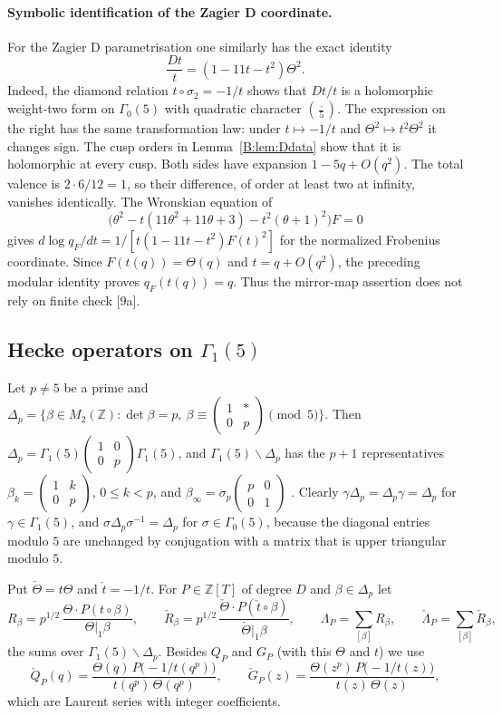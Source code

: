 \documentclass[11pt,a4paper]{article}
\theoremstyle{definition}\newtheorem{definition}[theorem]{Definition}
\theoremstyle{remark}\newtheorem{remark}[theorem]{Remark}
\newcommand{\Z}{\mathbb Z}
\newcommand{\bmat}[4]{\left(\begin{smallmatrix}#1&#2\\#3&#4\end{smallmatrix}\right)}
\numberwithin{equation}{section}
\begin{document}
\paragraph{Symbolic identification of the Zagier D coordinate.}
For the Zagier D parametrisation one similarly has the exact identity
\[
 \frac{Dt}{t}=(1-11t-t^2)\Theta^2.
\]
Indeed, the diamond relation $t\circ\sigma_2=-1/t$ shows that $Dt/t$
is a holomorphic weight-two form on $\Gamma_0(5)$ with quadratic
character $(\frac{\cdot}{5})$. The expression on the right has the
same transformation law: under $t\mapsto-1/t$ and
$\Theta^2\mapsto t^2\Theta^2$ it changes sign. The cusp orders in
Lemma~\ref{B:lem:Ddata} show that it is holomorphic at every cusp.
Both sides have expansion $1-5q+O(q^2)$. The total valence is
$2\cdot6/12=1$, so their difference, of order at least two at infinity,
vanishes identically. The Wronskian equation of
\[
 \bigl(\theta^2-t(11\theta^2+11\theta+3)
                    -t^2(\theta+1)^2\bigr)F=0
\]
gives $d\log q_F/dt=1/[t(1-11t-t^2)F(t)^2]$ for the normalized
Frobenius coordinate. Since $F(t(q))=\Theta(q)$ and $t=q+O(q^2)$,
the preceding modular identity proves $q_F(t(q))=q$. Thus the
mirror-map assertion does not rely on finite check [9a].

\subsection{Hecke operators on \texorpdfstring{$\Gamma_1(5)$}{Gamma1(5)}}
Let $p\ne5$ be a prime and $\Delta_p=\{\beta\in M_2(\Z):\det\beta=p,\ \beta\equiv\bmat1*0p\pmod5\}$. Then
$\Delta_p=\Gamma_1(5)\bmat100p\Gamma_1(5)$, and $\Gamma_1(5)\backslash\Delta_p$ has the $p+1$ representatives
$\beta_k=\bmat1k0p$, $0\le k<p$, and $\beta_\infty=\sigma_p\bmat p001$ \cite[Prop.~5.2.1]{DS05}. Clearly
$\gamma\Delta_p=\Delta_p\gamma=\Delta_p$ for $\gamma\in\Gamma_1(5)$, and $\sigma\Delta_p\sigma^{-1}=\Delta_p$ for
$\sigma\in\Gamma_0(5)$, because the diagonal entries modulo $5$ are unchanged by conjugation with a matrix that is upper
triangular modulo $5$.

Put $\check\Theta=t\Theta$ and $\check t=-1/t$. For $P\in\Z[T]$ of degree $D$ and $\beta\in\Delta_p$ let
\[
R_\beta=p^{1/2}\,\frac{\Theta\cdot P(t\circ\beta)}{\Theta|_1\beta},\qquad
\check R_\beta=p^{1/2}\,\frac{\check\Theta\cdot P(\check t\circ\beta)}{\check\Theta|_1\beta},\qquad
\Lambda_P=\sum_{[\beta]}R_\beta,\qquad \check\Lambda_P=\sum_{[\beta]}\check R_\beta,
\]
the sums over $\Gamma_1(5)\backslash\Delta_p$. Besides $Q_P$ and $G_P$ (with this $\Theta$ and $t$) we use
\[
\check Q_P(q)=\frac{\Theta(q)\,P\bigl(-1/t(q^p)\bigr)}{t(q^p)\,\Theta(q^p)},\qquad
\check G_P(z)=\frac{\Theta(z^p)\,P\bigl(-1/t(z)\bigr)}{t(z)\,\Theta(z)},
\]
which are Laurent series with integer coefficients.
\end{document}
